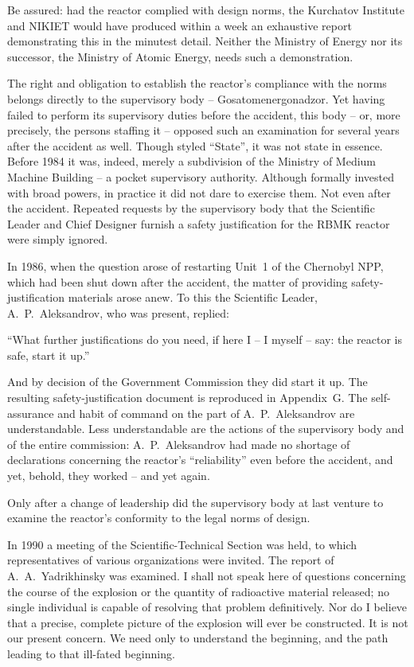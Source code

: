 \documentclass[openright]{bookest}
\begin{document}
Be assured: had the reactor complied with design norms, the Kurchatov Institute and NIKIET would have produced within a week an exhaustive report demonstrating this in the minutest detail. Neither the Ministry of Energy nor its successor, the Ministry of Atomic Energy, needs such a demonstration.

The right and obligation to establish the reactor's compliance with the norms belongs directly to the supervisory body -- Gosatomenergonadzor. Yet having failed to perform its supervisory duties before the accident, this body -- or, more precisely, the persons staffing it -- opposed such an examination for several years after the accident as well. Though styled ``State'', it was not state in essence. Before 1984 it was, indeed, merely a subdivision of the Ministry of Medium Machine Building -- a pocket supervisory authority. Although formally invested with broad powers, in practice it did not dare to exercise them. Not even after the accident. Repeated requests by the supervisory body that the Scientific Leader and Chief Designer furnish a safety justification for the RBMK reactor were simply ignored.

In 1986, when the question arose of restarting Unit~1 of the Chernobyl NPP, which had been shut down after the accident, the matter of providing safety-justification materials arose anew. To this the Scientific Leader, A.~P.~Aleksandrov, who was present, replied:

\begin{personal}
``What further justifications do you need, if here I -- I myself -- say: the reactor is safe, start it up.''
\end{personal}

And by decision of the Government Commission they did start it up. The resulting safety-justification document is reproduced in Appendix~G. The self-assurance and habit of command on the part of A.~P.~Aleksandrov are understandable. Less understandable are the actions of the supervisory body and of the entire commission: A.~P.~Aleksandrov had made no shortage of declarations concerning the reactor's ``reliability'' even before the accident, and yet, behold, they worked -- and yet again.

Only after a change of leadership did the supervisory body at last venture to examine the reactor's conformity to the legal norms of design.

In 1990 a meeting of the Scientific-Technical Section was held, to which representatives of various organizations were invited. The report of A.~A.~Yadrikhinsky was examined. I shall not speak here of questions concerning the course of the explosion or the quantity of radioactive material released; no single individual is capable of resolving that problem definitively. Nor do I believe that a precise, complete picture of the explosion will ever be constructed. It is not our present concern. We need only to understand the beginning, and the path leading to that ill-fated beginning.
\end{document}
